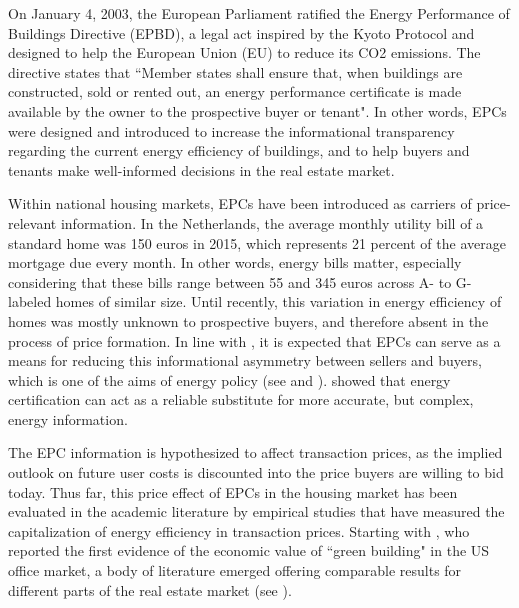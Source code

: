 \documentclass[12pt]{article}
\begin{document}
On January 4, 2003, the European Parliament ratified the Energy Performance of Buildings Directive (EPBD), a legal act inspired by the Kyoto Protocol and designed to help the European Union (EU) to reduce its CO2 emissions. The directive states that ``Member states shall ensure that, when buildings are constructed, sold or rented out, an energy performance certificate is made available by the owner to the prospective buyer or tenant". In other words, EPCs were designed and introduced to increase the informational transparency regarding the current energy efficiency of buildings, and to help buyers and tenants make well-informed decisions in the real estate market.

Within national housing markets, EPCs have been introduced as carriers of price-relevant information. In the Netherlands, the average monthly utility bill of a standard home was 150 euros in 2015, which represents 21 percent of the average mortgage due every month. In other words, energy bills matter, especially considering that these bills range between 55 and 345 euros across A- to G-labeled homes of similar size. Until recently, this variation in energy efficiency of homes was mostly unknown to prospective buyers, and therefore absent in the process of price formation. In line with \cite{akerlof1970vthe}, it is expected that EPCs can serve as a means for reducing this informational asymmetry between sellers and buyers, which is one of the aims of energy policy (see \cite{gayer2013overriding} and \cite{mannix2015limits}). \cite{houde2014consumers} showed that energy certification can act as a reliable substitute for more accurate, but complex, energy information. 

The EPC information is hypothesized to affect transaction prices, as the implied outlook on future user costs is discounted into the price buyers are willing to bid today. Thus far, this price effect of EPCs in the housing market has been evaluated in the academic literature by empirical studies that have measured the capitalization of energy efficiency in transaction prices. Starting with \cite{eichholtz2010doing}, who reported the first evidence of the economic value of ``green building" in the US office market, a body of literature emerged offering comparable results for different parts of the real estate market (see \citealp{brounen2011economics,fuerst2015does,kahn2014capitalization,walls2017energy}). 
\end{document}

